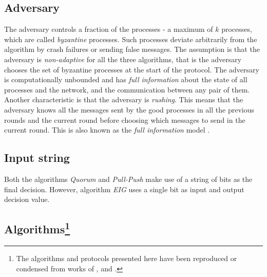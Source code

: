 \subsection{Adversary}
The adversary controls a fraction of the processes - a maximum of $k$ processes, which are called \textit{byzantine} processes. Such processes deviate arbitrarily from the algorithm by crash failures or sending false messages. The assumption is that the adversary is \textit{non-adaptive} for all the three algorithms, that is the adversary chooses the set of byzantine processes at the start of the protocol. The adversary is computationally unbounded and has \textit{full information} about the state of all processes and the network, and the communication between any pair of them. Another characteristic is that the adversary is \textit{rushing}. This means that the adversary knows all the messages sent by the good processes in all the previous rounds and the current round before choosing which messages to send in the current round. This is also known as the \textit{full information} model \cite{GGL98}.

\subsection{Input string}
Both the algorithms \textit{Quorum} and \textit{Pull-Push}  make use of a string of bits as the final decision. However, algorithm \textit{EIG} uses a single bit as input and output decision value.


\subsection{Algorithms\protect\footnote{The algorithms and protocols presented here have been reproduced or condensed from works of \cite{BPV06}, \cite{KM13} and \cite{BGH13}.}}

